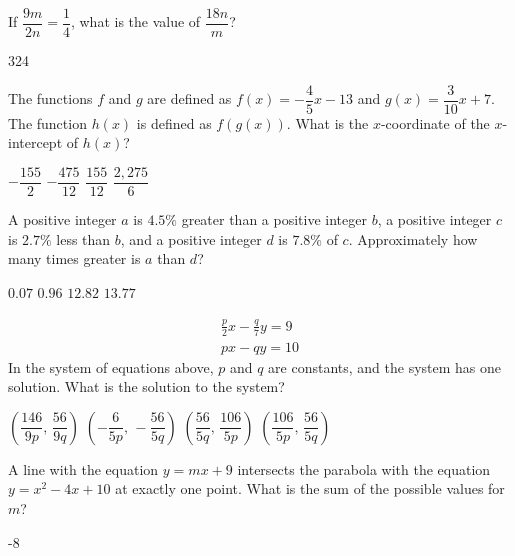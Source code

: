 \question[1]
If $\dfrac{9 m}{2 n}=\dfrac{1}{4}$, what is the value of $\dfrac{18 n}{m}$?
\begin{solution}
324
\end{solution}






\newpage




\question[1]
The functions $f$ and $g$ are defined as $f(x)=-\dfrac{4}{5} x-13$ and $g(x)=\dfrac{3}{10} x+7$. The function $h(x)$ is defined as $f(g(x))$. What is the $x$-coordinate of the $x$-intercept of $h(x)$?
\begin{choices}
  \CorrectChoice $-\dfrac{155}{2}$
  \choice $-\dfrac{475}{12}$
  \choice $\dfrac{155}{12}$
  \choice $\dfrac{2,275}{6}$
\end{choices}


\question[1]
A positive integer $a$ is $4.5\%$ greater than a positive integer $b$, a positive integer $c$ is $2.7\%$ less than $b$, and a positive integer $d$ is $7.8\%$ of $c$. Approximately how many times greater is $a$ than $d$?
\begin{choices}
  \choice $0.07$
  \choice $0.96$
  \choice $12.82$
  \CorrectChoice $13.77$
\end{choices}

\question[1]
\[
  \begin{gathered}
  \frac{p}{2} x-\frac{q}{7} y=9 \\
  p x-q y=10
  \end{gathered}
\]
In the system of equations above, $p$ and $q$ are constants, and the system has one solution. What is the solution to the system?
\begin{choices}
  \choice $\left(\dfrac{146}{9p},\, \dfrac{56}{9q}\right)$
  \choice $\left(-\dfrac{6}{5p},\, -\dfrac{56}{5q}\right)$
  \choice $\left(\dfrac{56}{5q},\, \dfrac{106}{5p}\right)$
  \CorrectChoice $\left(\dfrac{106}{5p},\, \dfrac{56}{5q}\right)$
\end{choices}







\newpage




\question[1]
A line with the equation $y = m x + 9$ intersects the parabola with the equation $y = x^2 - 4x + 10$ at exactly one point. What is the sum of the possible values for $m$?
\begin{solution}
-8
\end{solution}

